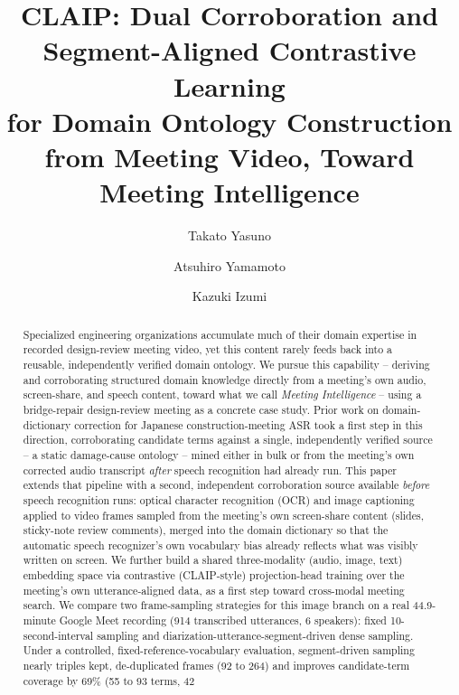 ﻿\documentclass[twocolumn]{article}
\title{CLAIP: Dual Corroboration and Segment-Aligned Contrastive Learning\\
for Domain Ontology Construction from Meeting Video, Toward Meeting Intelligence}
\author[1]{Takato Yasuno}
\author[1]{Atsuhiro Yamamoto}
\author[1]{Kazuki Izumi}
\affil[1]{Yachiyo Engineering Co., Ltd., Japan}
\affil[ ]{Email: yasunotkt@gmail.com}
\date{}
\begin{document}
\renewcommand{\abstractname}{Abstract}
\renewcommand{\refname}{References}
\renewcommand{\figurename}{Figure}
\renewcommand{\tablename}{Table}

\maketitle

\begin{abstract}

Specialized engineering organizations accumulate much of their domain expertise in recorded
design-review meeting video, yet this content rarely feeds back into a reusable, independently
verified domain ontology. We pursue this capability -- deriving and corroborating structured
domain knowledge directly from a meeting's own audio, screen-share, and speech content, toward what
we call \emph{Meeting Intelligence} -- using a bridge-repair design-review meeting as a concrete
case study. Prior work on domain-dictionary correction for Japanese construction-meeting ASR took a
first step in this direction, corroborating candidate terms against a single, independently
verified source -- a static damage-cause ontology -- mined either in bulk or from the meeting's own
corrected audio transcript \emph{after} speech recognition had already run. This paper extends that
pipeline with a second, independent
corroboration source available \emph{before} speech recognition runs: optical character recognition
(OCR) and image captioning applied to video frames sampled from the meeting's own screen-share
content (slides, sticky-note review comments), merged into the domain dictionary so that the
automatic speech recognizer's own vocabulary bias already reflects what was visibly written on
screen. We further build a shared three-modality (audio, image, text) embedding space via
contrastive (CLAIP-style) projection-head training over the meeting's own utterance-aligned data, as
a first step toward cross-modal meeting search. We compare two frame-sampling strategies for this
image branch on a real 44.9-minute Google Meet recording (914 transcribed utterances, 6 speakers):
fixed 10-second-interval sampling and diarization-utterance-segment-driven dense sampling. Under a
controlled, fixed-reference-vocabulary evaluation, segment-driven sampling nearly triples kept,
de-duplicated frames (92 to 264) and improves candidate-term coverage by 69\% (55 to 93 terms, 42

\end{abstract}
\end{document}
